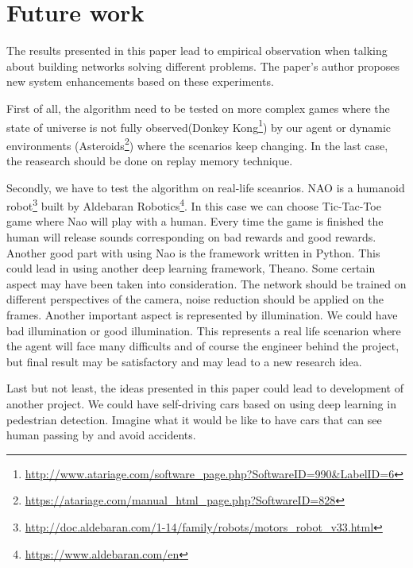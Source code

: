 \chapter{Future work}
\label{chapter:future-work}

The results presented in this paper lead to empirical observation when talking about building networks solving different problems. The paper's author proposes new system enhancements based on these experiments.

First of all, the algorithm need to be tested on more complex games where the state of universe is not fully observed(Donkey Kong\footnote{\url{http://www.atariage.com/software_page.php?SoftwareID=990&LabelID=6}}) by our agent or dynamic environments (Asteroids\footnote{\url{https://atariage.com/manual_html_page.php?SoftwareID=828}}) where the scenarios keep changing. In the last case, the reasearch should be done on replay memory technique.

Secondly, we have to test the algorithm on real-life sceanrios. NAO is a humanoid robot\footnote{\url{http://doc.aldebaran.com/1-14/family/robots/motors_robot_v33.html}} built by Aldebaran Robotics\footnote{\url{https://www.aldebaran.com/en}}. In this case we can choose Tic-Tac-Toe game where Nao will play with a human. Every time the game is finished the human will release sounds corresponding on bad rewards and good rewards. Another good part with using Nao is the framework written in Python. This could lead in using another deep learning framework, Theano. Some certain aspect may have been taken into consideration. The network should be trained on different perspectives of the camera, noise reduction should be applied on the frames. Another important aspect is represented by illumination. We could have bad illumination or good illumination. This represents a real life scenarion where the agent will face many difficults and of course the engineer behind the project, but final result may be satisfactory and may lead to a new research idea.

Last but not least, the ideas presented in this paper could lead to development of another project. We could have self-driving cars based on using deep learning in pedestrian detection. Imagine what it would be like to have cars that can see human passing by and avoid accidents.
